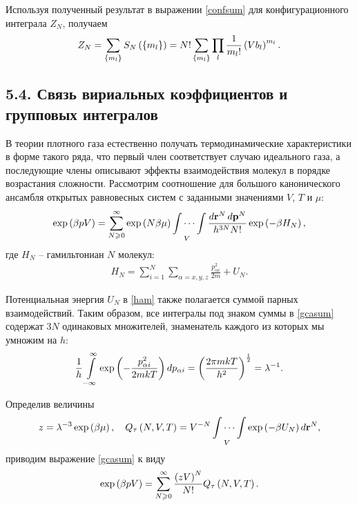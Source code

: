 Используя полученный результат в выражении \eqref{confsum} для конфигурационного интеграла $Z_N$, получаем
\vverh
\begin{gather}
	Z_N = \sum_{\left\{ m_l \right\}} S_N \left( \left\{ m_l \right\} \right) = N! \sum_{\left\{ m_l \right\}} \prod_l \frac{1}{m_l!} \left( V b_l \right)^{m_l}. \label{confsum2}
\end{gather}

\subsection*{\textbf{5.4.} Связь вириальных коэффициентов и групповых интегралов \cite{mayer, meyson}}

В теории плотного газа естественно получать термодинамические характеристики в форме такого ряда, что первый член соответствует случаю идеального газа, а последующие члены описывают эффекты взаимодействия молекул в порядке возрастания сложности. Рассмотрим соотношение для большого канонического ансамбля открытых равновесных систем с заданными значениями $V$, $T$ и $\mu$:
\vverh
\begin{gather}
	\exp \left( \beta p V \right) = \sum_{N \geqslant 0}^\infty \exp \left( N \beta \mu \right) \idotsint\limits_V \frac{d \mathbf{r}^N \, d \mathbf{p}^N}{h^{3N} N!} \exp \left( - \beta H_N \right), \label{gcasum}
\end{gather}
где $H_N$ -- гамильтониан $N$ молекул:
\vverh
\begin{gather}
	H_N = \sum_{i = 1}^N \sum_{\alpha = x, y, z} \frac{p_{\alpha i}^2}{2 m} + U_N. \label{ham}
\end{gather}

Потенциальная энергия $U_N$ в \eqref{ham} также полагается суммой парных взаимодействий. Таким образом, все интегралы под знаком суммы в \eqref{gcasum} содержат $3N$ одинаковых множителей, знаменатель каждого из которых мы умножим на $h$:
\vverh
\begin{gather}
	\frac{1}{h} \int\limits_{-\infty}^{\infty} \exp \left( - \frac{p_{\alpha i}^2}{2m kT} \right) d p_{\alpha i} = \left( \frac{2 \pi m k T}{h^2} \right)^{\frac{1}{2}} = \lambda^{-1}. \notag
\end{gather}

Определив величины
\vverh
\begin{gather}
	z = \lambda^{-3} \exp \left( \beta \mu \right), \quad Q_{\tau} \left( N, V, T \right) = V^{-N} \idotsint\limits_V \exp \left( - \beta U_N \right) d \mathbf{r}^N, \notag
\end{gather}
приводим выражение \eqref{gcasum} к виду
\vverh
\begin{gather}
	\exp \left( \beta p V \right) = \sum_{N \geqslant 0}^\infty \frac{ \left( z V \right)^N}{N!} Q_\tau \left( N, V, T \right). \label{gcasum2} 
\end{gather}

